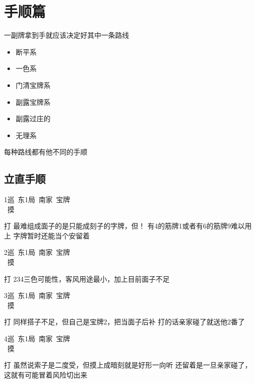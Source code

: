 \documentclass[小V的日麻笔记.tex]{subfiles}
\begin{document}
\chapter{手顺篇}
一副牌拿到手就应该决定好其中一条路线
\begin{itemize}
\item 断平系
\item 一色系
\item 门清宝牌系
\item 副露宝牌系
\item 副露过庄的
\item 无理系
\end{itemize}

每种路线都有他不同的手顺
\section{立直手顺}
1巡\ 东1局\ 南家\ 宝牌\\
\ 摸 \\
\begin{itemize}
\arrowitem 打
\arrowitem 最难组成面子的是只能成刻子的字牌，但！
\arrowitem 有4的筋牌1或者有6的筋牌9难以用上
\arrowitem 字牌暂时还能当个安留着
\end{itemize}

2巡\ 东1局\ 南家\ 宝牌\\
\ 摸 \\
\begin{itemize}
\arrowitem 打
\arrowitem 234三色可能性，客风用途最小，加上目前面子不足
\end{itemize}

3巡\ 东1局\ 南家\ 宝牌\\
\ 摸 \\
\begin{itemize}
\arrowitem 打
\arrowitem 同样搭子不足，但自己是宝牌2，把当面子后补
\arrowitem 打的话亲家碰了就送他2番了
\end{itemize}

4巡\ 东1局\ 南家\ 宝牌\\
\ 摸 \\
\begin{itemize}
\arrowitem 打
\arrowitem 虽然说索子是二度受，但摸上成暗刻就是好形一向听
\arrowitem 还留着是一旦亲家碰了，这就有可能冒着风险切出来
\end{itemize}
\end{document}
